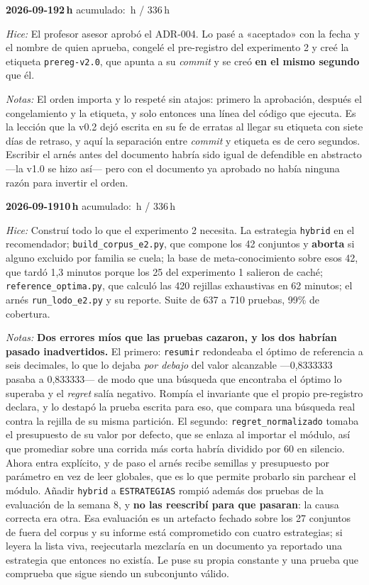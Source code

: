 \documentclass[11pt,letterpaper]{article}
\newcommand{\presupuesto}{336}
\newcommand{\horasacum}{0}
\newcommand{\entrada}[4]{%
  \xdef\horasacum{\fpeval{\horasacum + #2}}%
  \par\medskip
  \noindent\textbf{\color{tecnavy}#1}\quad\textbf{#2\,h}%
  \hfill{\small\color{gris}acumulado: \horasacum\,h / \presupuesto\,h}\par
  \nopagebreak
  \noindent\textit{Hice:} #3\par
  \nopagebreak
  \noindent\textit{Notas:} #4\par
}
\begin{document}
\entrada{2026-09-19}{2}
{El profesor asesor aprobó el ADR-004. Lo pasé a «aceptado» con la fecha y el nombre de
 quien aprueba, congelé el pre-registro del experimento 2 y creé la etiqueta
 \texttt{prereg-v2.0}, que apunta a su \emph{commit} y se creó \textbf{en el mismo
 segundo} que él.}
{El orden importa y lo respeté sin atajos: primero la aprobación, después el
 congelamiento y la etiqueta, y solo entonces una línea del código que ejecuta. Es la
 lección que la v0.2 dejó escrita en su fe de erratas al llegar su etiqueta con siete días
 de retraso, y aquí la separación entre \emph{commit} y etiqueta es de cero segundos.
 Escribir el arnés antes del documento habría sido igual de defendible en abstracto
 —la v1.0 se hizo así— pero con el documento ya aprobado no había ninguna razón para
 invertir el orden.}

\entrada{2026-09-19}{10}
{Construí todo lo que el experimento 2 necesita. La estrategia \texttt{hybrid} en el
 recomendador; \texttt{build\_corpus\_e2.py}, que compone los 42 conjuntos y
 \textbf{aborta} si alguno excluido por familia se cuela; la base de meta-conocimiento
 sobre esos 42, que tardó 1,3 minutos porque los 25 del experimento 1 salieron de caché;
 \texttt{reference\_optima.py}, que calculó las 420 rejillas exhaustivas en 62 minutos; el
 arnés \texttt{run\_lodo\_e2.py} y su reporte. Suite de 637 a 710 pruebas, 99\% de
 cobertura.}
{\textbf{Dos errores míos que las pruebas cazaron, y los dos habrían pasado
 inadvertidos.} El primero: \texttt{resumir} redondeaba el óptimo de referencia a seis
 decimales, lo que lo dejaba \emph{por debajo} del valor alcanzable —0,8333333 pasaba a
 0,833333— de modo que una búsqueda que encontraba el óptimo lo superaba y el
 \emph{regret} salía negativo. Rompía el invariante que el propio pre-registro declara, y
 lo destapó la prueba escrita para eso, que compara una búsqueda real contra la rejilla de
 su misma partición. El segundo: \texttt{regret\_normalizado} tomaba el presupuesto de su
 valor por defecto, que se enlaza al importar el módulo, así que promediar sobre una
 corrida más corta habría dividido por 60 en silencio. Ahora entra explícito, y de paso el
 arnés recibe semillas y presupuesto por parámetro en vez de leer globales, que es lo que
 permite probarlo sin parchear el módulo. Añadir \texttt{hybrid} a \texttt{ESTRATEGIAS}
 rompió además dos pruebas de la evaluación de la semana 8, y \textbf{no las reescribí
 para que pasaran}: la causa correcta era otra. Esa evaluación es un artefacto fechado
 sobre los 27 conjuntos de fuera del corpus y su informe está comprometido con cuatro
 estrategias; si leyera la lista viva, reejecutarla mezclaría en un documento ya reportado
 una estrategia que entonces no existía. Le puse su propia constante y una prueba que
 comprueba que sigue siendo un subconjunto válido.}
\end{document}
